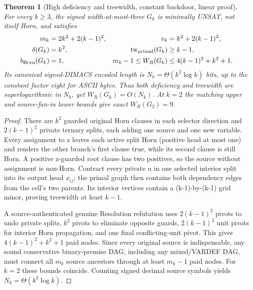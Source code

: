 \documentclass[11pt]{article}
\newtheorem{theorem}{Theorem}
\begin{document}
\begin{theorem}[High deficiency and treewidth, constant backdoor, linear proof]
For every $k\ge3$, the signed width-at-most-three $G_k$ is minimally UNSAT, not itself Horn, and satisfies
\[
\begin{aligned}
m_k&=2k^2+2(k-1)^2,&v_k&=k^2+2(k-1)^2,\\
\delta(G_k)&=k^2,&\mathrm{tw}_{\rm primal}(G_k)&\ge k-1,\\
b_{\rm Horn}(G_k)&=1,&m_k-1\le W_R(G_k)&\le 4(k-1)^2+k^2+1.
\end{aligned}
\]
Its canonical signed-DIMACS encoded length is $N_k=\Theta(k^2\log k)$ bits, up to the constant factor eight for ASCII bytes. Thus both deficiency and treewidth are superlogarithmic in $N_k$, yet $W_R(G_k)=O(N_k)$. At $k=2$ the matching upper and source-fan-in lower bounds give exact $W_R(G_2)=9$.
\end{theorem}
\begin{proof}
There are $k^2$ guarded original Horn clauses in each selector direction and $2(k-1)^2$ private ternary splits, each adding one source and one new variable. Every assignment to z leaves each active split Horn (positive head at most one) and renders the other branch's first clause true, while its second clause is still Horn. A positive z-guarded root clause has two positives, so the source without assignment is non-Horn. Contract every private u in one selected interior split into its output head $x_{ij}$; the primal graph then contains both dependency edges from the cell's two parents. Its interior vertices contain a (k-1)-by-(k-1) grid minor, proving treewidth at least $k-1$.

A source-authenticated genuine Resolution refutation uses $2(k-1)^2$ pivots to undo private splits, $k^2$ pivots to eliminate opposite guards, $2(k-1)^2$ unit pivots for interior Horn propagation, and one final conflicting-unit pivot. This gives $4(k-1)^2+k^2+1$ paid nodes. Since every original source is indispensable, any sound conservative binary-premise DAG, including any mixed/VARDEF DAG, must connect all $m_k$ source ancestors through at least $m_k-1$ paid nodes. For $k=2$ these bounds coincide. Counting signed decimal source symbols yields $N_k=\Theta(k^2\log k)$.
\end{proof}
\end{document}
